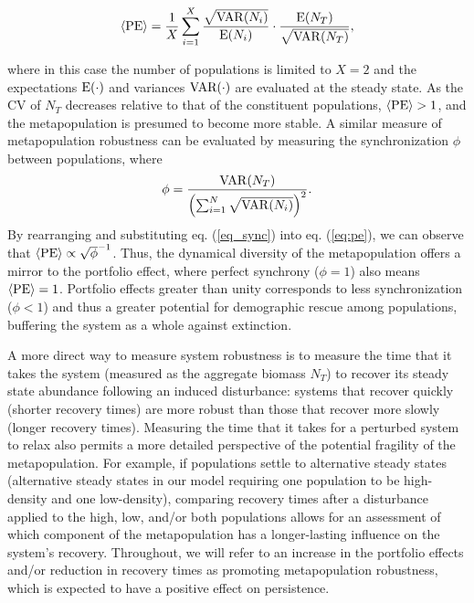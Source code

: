 \documentclass[twocolumn,preprintnumbers,amsmath,amssymb,superscriptaddress]{revtex4}
\begin{document}
\begin{equation}
\langle{\rm PE}\rangle =\frac{1}{X}\sum_{i=1}^{X} \frac{\sqrt{{\rm VAR}(N_i)}}{{\rm E}(N_i)}\cdot \frac{{\rm E}(N_T)}{\sqrt{{\rm VAR}(N_T)}},
\label{eq:pe}
\end{equation}

\noindent where in this case the number of populations is limited to $X=2$ and the expectations $\rm E(\cdot)$ and variances $\rm VAR(\cdot)$ are evaluated at the steady state.
As the CV of $N_T$ decreases relative to that of the constituent populations, $\langle{\rm PE}\rangle > 1$, and the metapopulation is presumed to become more stable.
{\color{red} A similar measure of metapopulation robustness can be evaluated by measuring the synchronization $\phi$ between populations, where 
\begin{equation}
\label{eq_sync}
\phi = \frac{{\rm VAR}(N_T)}{\left(\sum_{i=1}^N\sqrt{{\rm VAR}(N_i)}\right)^2}.
\end{equation}
By rearranging and substituting eq. (\ref{eq_sync}) into eq. (\ref{eq:pe}), we can observe that $\langle{\rm PE}\rangle \propto \sqrt{\phi}^{-1}$.
Thus, the dynamical diversity of the metapopulation offers a mirror to the portfolio effect, where perfect synchrony ($\phi = 1$) also means $\langle{\rm PE}\rangle = 1$.}
Portfolio effects greater than unity corresponds to less synchronization ($\phi < 1$) \cite{Loreau:2008ju,Anderson:2014cx,Yeakel:2013vz} and thus a greater potential for demographic rescue among populations, buffering the system as a whole against extinction. 

A more direct way to measure system robustness is to measure the time that it takes the system (measured as the aggregate biomass $N_T$) to recover its steady state abundance following an induced disturbance: systems that recover quickly (shorter recovery times) are more robust than those that recover more slowly (longer recovery times).
Measuring the time that it takes for a perturbed system to relax also permits a more detailed perspective of the potential fragility of the metapopulation.
For example, if populations settle to alternative steady states (alternative steady states in our model requiring one population to be high-density and one low-density), comparing recovery times after a disturbance applied to the high, low, and/or both populations allows for an assessment of which component of the metapopulation has a longer-lasting influence on the system's recovery.
Throughout, we will refer to an increase in the portfolio effects and/or reduction in recovery times as promoting metapopulation robustness, which is expected to have a positive effect on persistence.
\\
\end{document}
